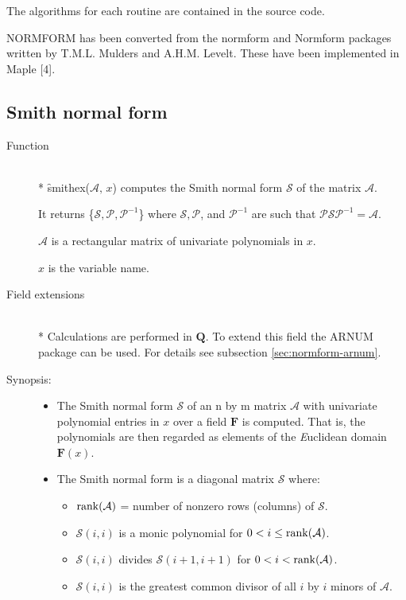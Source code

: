 The algorithms for each routine are contained in the source code.

{\small NORMFORM} has been converted from the normform and Normform
packages written by T.M.L. Mulders and A.H.M. Levelt. These have been
implemented in Maple [4].


\subsection{Smith normal form}

\begin{description}
\item[Function]\mbox{}\\*
\f{smithex}($\mathcal{A},\, x$) computes the Smith normal form $\mathcal{ S}$
of the matrix $\mathcal{ A}$.

It returns \{$\mathcal{ S}, \mathcal{ P}, \mathcal{ P}^{-1}$\} where $\mathcal{ S},
\mathcal{ P}$, and $\mathcal{ P}^{-1}$ are such that $\mathcal{ P S P}^{-1} =
\mathcal{ A}$.

$\mathcal{ A}$ is a rectangular matrix of univariate polynomials in $x$.

$x$ is the variable name.

\item[Field extensions]\mbox{}\\*
Calculations are performed in $\mathbf{Q}$. To extend this field the
{\small ARNUM} package can be used. For details see subsection \ref{sec:normform-arnum}.

\item[Synopsis:]
\begin{itemize}
\item The Smith normal form $\mathcal{S}$ of an n by m matrix $\mathcal{A}$
with univariate polynomial entries in $x$ over a field $\mathbf{F}$ is
computed. That is, the polynomials are then regarded as elements of the
{\it E}uclidean domain $\mathbf{F}(x)$.

\item The Smith normal form is a diagonal matrix $\mathcal{S}$ where:

  \begin{itemize}
  \item $\mathop{\mathrm{rank}}(\mathcal{A})$ = number of nonzero rows (columns) of
        $\mathcal{S}$.
  \item $\mathcal{S}(i,i)$ is a monic polynomial for $0 < i \leq \mathop{\mathrm{rank}}(\mathcal{A})$.
  \item $\mathcal{S}(i,i)$ divides $\mathcal{S}(i+1,i+1)$ for $0 < i < \mathop{\mathrm{rank}}(\mathcal{A})$.
  \item $\mathcal{ S}(i,i)$ is the greatest common divisor of all $i$ by
        $i$ minors of $\mathcal{A}$.
  \end{itemize}


\end{itemize}
\end{description}
